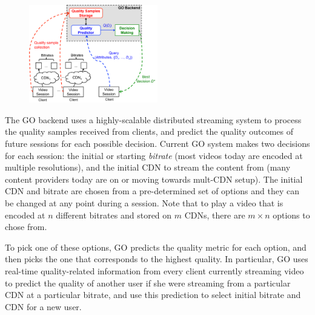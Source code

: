 \begin{figure}[h!]
\centering
 \includegraphics[width=0.5\textwidth] {figures/go-overview.pdf}
\label{fig:go-overview}
\end{figure}
 
The GO backend uses a highly-scalable distributed streaming system to
process the quality samples received from clients, and predict the
quality outcomes of future sessions for each possible decision. 
Current GO system makes two decisions for each session: the 
initial or starting {\it bitrate} (most videos today are encoded at multiple resolutions), and
the initial CDN to stream the content from (many content providers today are on or 
moving towards mult-CDN setup). The initial CDN and bitrate are chosen from a
pre-determined set of options and they can be changed at any point
during a session. Note that to play a video that is encoded at $n$
different bitrates and stored on $m$ CDNs, there are $m\times n$
options to chose from.  

To pick one of these options, GO predicts the quality metric for each
option, and then picks the one that corresponds to the highest
quality. In particular, GO uses real-time quality-related information
from every client currently streaming video to predict the quality of
another user if she were streaming from a particular CDN at a
particular bitrate, and use this prediction to select initial bitrate
and CDN for a new user.



\label{subsec:dataset}

